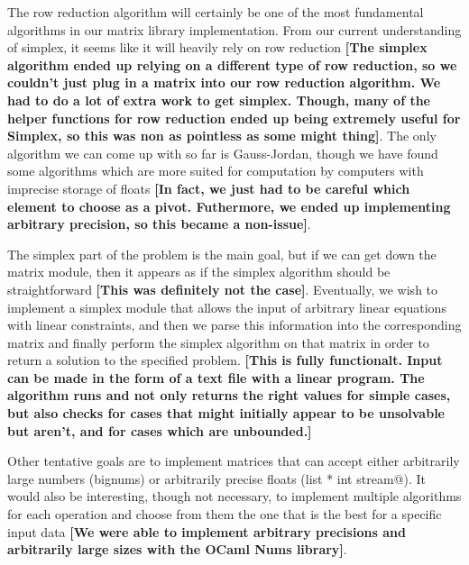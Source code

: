 \documentclass[letterpaper,11pt]{article}
\newcommand{\annot}[1]{\textbf{\color{BrickRed} [#1]}}
\begin{document}
The row reduction algorithm will certainly be one of the most fundamental
algorithms in our matrix library implementation. From our current understanding
of simplex, it seems like it will heavily rely on row reduction {\annot{The
simplex algorithm ended up relying on a different type of row reduction, so we
couldn't just plug in a matrix into our row reduction algorithm. We had to do a
lot of extra work to get simplex. Though, many of the helper functions for row
reduction ended up being extremely useful for Simplex, so this was non as pointless
as some might thing}}. The only algorithm we can come up with so
far is Gauss-Jordan, though we have found some algorithms which are more suited
for computation by computers with imprecise storage of floats {\annot{In fact,
we just had to be careful which element to choose as a pivot. Futhermore, we
ended up implementing arbitrary precision, so this became a non-issue}}.

The simplex part of the problem is the main goal, but if we can get down the
matrix module, then it appears as if the simplex algorithm should be
straightforward {\annot{This was definitely not the case}}. Eventually, we wish
to implement a simplex module that allows the input of arbitrary linear
equations with linear constraints, and then we parse this information into the
corresponding matrix and finally perform the simplex algorithm on that matrix in
order to return a solution to the specified problem.{\annot{This is fully functionalt.
Input can be made in the form of a text file with a linear program. The algorithm
runs and not only returns the right values for simple cases, but also checks for
cases that might initially appear to be unsolvable but aren't, and for cases which
are unbounded.}}

Other tentative goals are to implement matrices that can accept either
arbitrarily large numbers (bignums) or arbitrarily precise floats 
(\verb@int list * int stream@). It would also be interesting, though not
necessary, to implement multiple algorithms for each operation and choose from
them the one that is the best for a specific input data {\annot{We were able to
implement arbitrary precisions and arbitrarily large sizes with the OCaml Nums
library}}.
\end{document}
